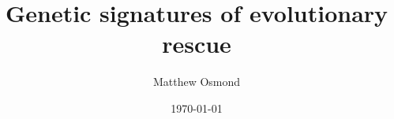 \documentclass{beamer}
\title{Genetic signatures of evolutionary rescue}
\author{Matthew Osmond}
\institute{Department of Ecology and Evolutionary Biology\\ University of Toronto}
\date{\today}
\begin{document}
\begin{frame}
    \titlepage
\end{frame}




\end{document}
